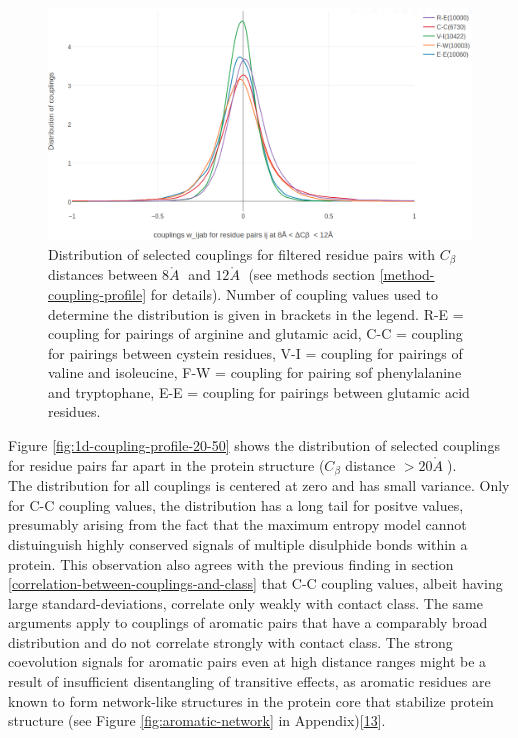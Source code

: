 \documentclass[12pt,a4paper,twoside]{book}
\newcommand{\Cb}{C_\beta}
\newcommand{\angstrom}{\mathring{A} \;}
\theoremstyle{definition}
\theoremstyle{definition}
\theoremstyle{remark}
\begin{document}
\begin{figure}
\includegraphics[width=1\linewidth]{img/coupling_matrix_analysis/1d_coupling_profile_8_12} \caption{Distribution of selected
couplings for filtered residue pairs with \(\Cb\) distances between
\(8\angstrom\) and \(12 \angstrom\) (see methods section
\ref{method-coupling-profile} for details). Number of coupling values
used to determine the distribution is given in brackets in the legend.
R-E = coupling for pairings of arginine and glutamic acid, C-C =
coupling for pairings between cystein residues, V-I = coupling for
pairings of valine and isoleucine, F-W = coupling for pairing sof
phenylalanine and tryptophane, E-E = coupling for pairings between
glutamic acid residues.}\label{fig:1d-coupling-profile-8-12}
\end{figure}

Figure \ref{fig:1d-coupling-profile-20-50} shows the distribution of
selected couplings for residue pairs far apart in the protein structure
(\(\Cb\) distance \(> 20\angstrom\)).\\
The distribution for all couplings is centered at zero and has small
variance. Only for C-C coupling values, the distribution has a long tail
for positve values, presumably arising from the fact that the maximum
entropy model cannot distuinguish highly conserved signals of multiple
disulphide bonds within a protein. This observation also agrees with the
previous finding in section
\ref{correlation-between-couplings-and-class} that C-C coupling values,
albeit having large standard-deviations, correlate only weakly with
contact class. The same arguments apply to couplings of aromatic pairs
that have a comparably broad distribution and do not correlate strongly
with contact class. The strong coevolution signals for aromatic pairs
even at high distance ranges might be a result of insufficient
disentangling of transitive effects, as aromatic residues are known to
form network-like structures in the protein core that stabilize protein
structure (see Figure \ref{fig:aromatic-network} in
Appendix){[}\protect\hyperlink{ref-Burley1985}{13}{]}.
\end{document}

